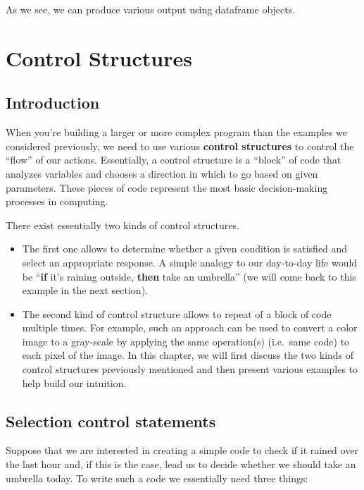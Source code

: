 \documentclass[12pt,]{krantz}
\providecommand{\tightlist}{%
  \setlength{\itemsep}{0pt}\setlength{\parskip}{0pt}}
\begin{document}
As we see, we can produce various output using dataframe objects.

\chapter{Control Structures}\label{control}

\section{Introduction}\label{introduction-1}

When you're building a larger or more complex program than the examples
we considered previously, we need to use various \textbf{control
structures} to control the ``flow'' of our actions. Essentially, a
control structure is a ``block'' of code that analyzes variables and
chooses a direction in which to go based on given parameters. These
pieces of code represent the most basic decision-making processes in
computing.

There exist essentially two kinds of control structures.

\begin{itemize}
\tightlist
\item
  The first one allows to determine whether a given condition is
  satisfied and select an appropriate response. A simple analogy to our
  day-to-day life would be ``\textbf{if} it's raining outside,
  \textbf{then} take an umbrella'' (we will come back to this example in
  the next section).
\item
  The second kind of control structure allows to repeat of a block of
  code multiple times. For example, such an approach can be used to
  convert a color image to a gray-scale by applying the same
  operation(s) (i.e.~same code) to each pixel of the image. In this
  chapter, we will first discuss the two kinds of control structures
  previously mentioned and then present various examples to help build
  our intuition.
\end{itemize}

\section{Selection control statements}\label{selcontrostat}

Suppose that we are interested in creating a simple code to check if it
rained over the last hour and, if this is the case, lead us to decide
whether we should take an umbrella today. To write such a code we
essentially need three things:
\end{document}
